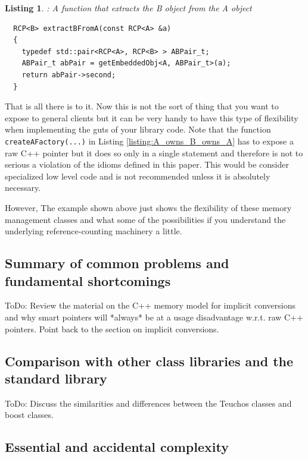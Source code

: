 \documentclass[pdf,ps2pdf,11pt]{SANDreport}
\newtheorem{listing}{Listing}
\begin{document}
\begin{listing}: A function that extracts the B object from the A object \\
\label{listing:Extract_B_from_A}
{\small\begin{verbatim}
  RCP<B> extractBFromA(const RCP<A> &a)
  {
    typedef std::pair<RCP<A>, RCP<B> > ABPair_t;
    ABPair_t abPair = getEmbeddedObj<A, ABPair_t>(a);
    return abPair->second;
  }
\end{verbatim}}
\end{listing}

That is all there is to it.  Now this is not the sort of thing that
you want to expose to general clients but it can be very handy to have
this type of flexibility when implementing the guts of your library
code.  Note that the function {}\texttt{createAFactory(...)} in
Listing {}\ref{listing:A_owns_B_owns_A} has to expose a raw C++
pointer but it does so only in a single statement and therefore is not
to serious a violation of the idioms defined in this paper.  This
would be consider specialized low level code and is not recommended
unless it is absolutely necessary.

However, The example shown above just shows the flexibility of these
memory management classes and what some of the possibilities if you
understand the underlying reference-counting machinery a little.


%
{}\subsection{Summary of common problems and fundamental shortcomings}
%

ToDo: Review the material on the C++ memory model for implicit
conversions and why smart pointers will *always* be at a usage
disadvantage w.r.t. raw C++ pointers.  Point back to the section on
implicit conversions.


%
{}\subsection{Comparison with other class libraries and the standard
library}
%

ToDo: Discuss the similarities and differences between the Teuchos
classes and boost classes.


%
{}\subsection{Essential and accidental complexity}
%
\end{document}
